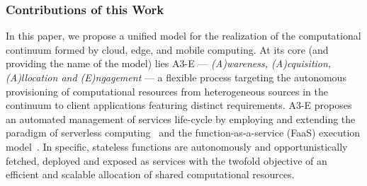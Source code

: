 
%


\subsubsection*{Contributions of this Work}


In this paper, we propose a unified model for the realization of the computational continuum formed by cloud, edge, and mobile computing. At its core (and providing the name of the model) lies A3-E --- \textit{(A)wareness, (A)cquisition, (A)llocation and (E)ngagement} --- a flexible process targeting the autonomous provisioning of computational resources from heterogeneous sources in the continuum to client applications featuring distinct requirements. 
A3-E proposes an automated management of services life-cycle by employing and extending the paradigm of serverless computing~\cite{Hendrickson:2016,baldini2017serverless,GarrigaMendonca2017} and the function-as-a-service (FaaS) execution model~\cite{MateosFaaster17}. In specific, stateless functions are autonomously and opportunistically fetched, deployed and exposed as services with the twofold objective of an efficient and scalable allocation of shared computational resources. 

